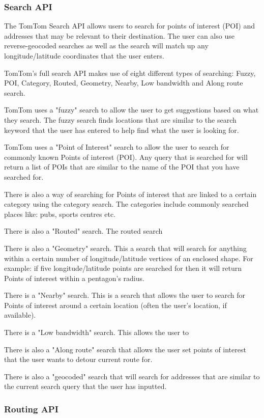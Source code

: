 \documentclass[12pt,a4paper]{article}
\begin{document}
\subsubsection{Search API}
The TomTom Search API allows users to search for points of interest (POI) and addresses that may be relevant to their destination. The user can also use reverse-geocoded searches as well as the search will match up any longitude/latitude coordinates that the user enters.

TomTom's full search API makes use of eight different types of searching: Fuzzy, POI, Category, Routed, Geometry, Nearby, Low bandwidth and Along route search.

TomTom uses a "fuzzy" search to allow the user to get suggestions based on what they search. The fuzzy search finds locations that are similar to the search keyword that the user has entered to help find what the user is looking for. 

TomTom uses a "Point of Interest" search to allow the user to search for commonly known Points of interest (POI). Any query that is searched for will return a list of POIs that are similar to the name of the POI that you have searched for.

There is also a way of searching for Points of interest that are linked to a certain category using the category search. The categories include commonly searched places like: pubs, sports centres etc.

There is also a "Routed" search. The routed search 

There is also a "Geometry" search. This a search that will search for anything within a certain number of longitude/latitude vertices of an enclosed shape. For example: if five longitude/latitude points are searched for then it will return Points of interest within a pentagon's radius. 

There is a "Nearby" search. This is a search that allows the user to search for Points of interest around a certain location (often the user's location, if available).

There is a "Low bandwidth" search. This allows the user to 

There is also a "Along route" search that allows the user set points of interest that the user wants to detour current route for. 

There is also a "geocoded" search that will search for addresses that are similar to the current search query that the user has inputted.

\subsubsection{Routing API}
\end{document}
